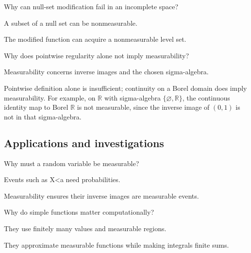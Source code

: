 \begin{exercise}\label{exr:iii02-expand-11}
Why can null-set modification fail in an incomplete space?
\end{exercise}
\begin{hint}
A subset of a null set can be nonmeasurable.
\end{hint}
\begin{solution}
The modified function can acquire a nonmeasurable level set.
\end{solution}

\begin{exercise}\label{exr:iii02-expand-12}
Why does pointwise regularity alone not imply measurability?
\end{exercise}
\begin{hint}
Measurability concerns inverse images and the chosen sigma-algebra.
\end{hint}
\begin{solution}
Pointwise definition alone is insufficient; continuity on a Borel domain does imply measurability. For example, on $\mathbb R$ with sigma-algebra $\{\varnothing,\mathbb R\}$, the continuous identity map to Borel $\mathbb R$ is not measurable, since the inverse image of $(0,1)$ is not in that sigma-algebra.
\end{solution}

\subsection*{Applications and investigations}

\begin{exercise}\label{exr:iii02-expand-13}
Why must a random variable be measurable?
\end{exercise}
\begin{hint}
Events such as X<a need probabilities.
\end{hint}
\begin{solution}
Measurability ensures their inverse images are measurable events.
\end{solution}

\begin{exercise}[Quantization]\label{exr:iii02-expand-14}
Why do simple functions matter computationally?
\end{exercise}
\begin{hint}
They use finitely many values and measurable regions.
\end{hint}
\begin{solution}
They approximate measurable functions while making integrals finite sums.
\end{solution}

